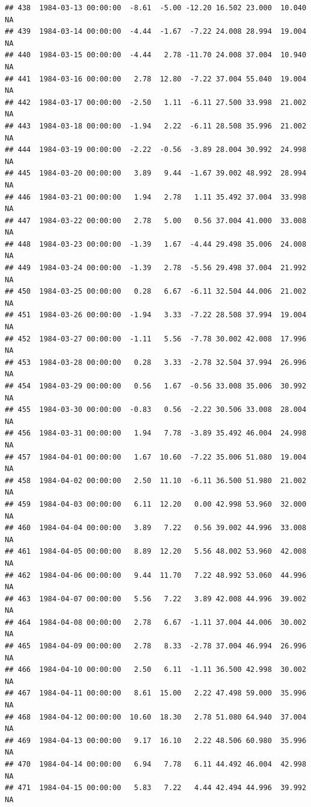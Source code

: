 \documentclass{article}\usepackage{graphicx, color}
\makeatletter
\newenvironment{kframe}{%
 \def\at@end@of@kframe{}%
 \ifinner\ifhmode%
  \def\at@end@of@kframe{\end{minipage}}%
  \begin{minipage}{\columnwidth}%
 \fi\fi%
 \def\FrameCommand##1{\hskip\@totalleftmargin \hskip-\fboxsep
 \colorbox{shadecolor}{##1}\hskip-\fboxsep
     \hskip-\linewidth \hskip-\@totalleftmargin \hskip\columnwidth}%
 \MakeFramed {\advance\hsize-\width
   \@totalleftmargin\z@ \linewidth\hsize
   \@setminipage}}%
 {\par\unskip\endMakeFramed%
 \at@end@of@kframe}
\newenvironment{knitrout}{}{} %
\makeatother
\begin{document}
\begin{knitrout}
\begin{kframe}
\begin{verbatim}
## 438  1984-03-13 00:00:00  -8.61  -5.00 -12.20 16.502 23.000  10.040     NA
## 439  1984-03-14 00:00:00  -4.44  -1.67  -7.22 24.008 28.994  19.004     NA
## 440  1984-03-15 00:00:00  -4.44   2.78 -11.70 24.008 37.004  10.940     NA
## 441  1984-03-16 00:00:00   2.78  12.80  -7.22 37.004 55.040  19.004     NA
## 442  1984-03-17 00:00:00  -2.50   1.11  -6.11 27.500 33.998  21.002     NA
## 443  1984-03-18 00:00:00  -1.94   2.22  -6.11 28.508 35.996  21.002     NA
## 444  1984-03-19 00:00:00  -2.22  -0.56  -3.89 28.004 30.992  24.998     NA
## 445  1984-03-20 00:00:00   3.89   9.44  -1.67 39.002 48.992  28.994     NA
## 446  1984-03-21 00:00:00   1.94   2.78   1.11 35.492 37.004  33.998     NA
## 447  1984-03-22 00:00:00   2.78   5.00   0.56 37.004 41.000  33.008     NA
## 448  1984-03-23 00:00:00  -1.39   1.67  -4.44 29.498 35.006  24.008     NA
## 449  1984-03-24 00:00:00  -1.39   2.78  -5.56 29.498 37.004  21.992     NA
## 450  1984-03-25 00:00:00   0.28   6.67  -6.11 32.504 44.006  21.002     NA
## 451  1984-03-26 00:00:00  -1.94   3.33  -7.22 28.508 37.994  19.004     NA
## 452  1984-03-27 00:00:00  -1.11   5.56  -7.78 30.002 42.008  17.996     NA
## 453  1984-03-28 00:00:00   0.28   3.33  -2.78 32.504 37.994  26.996     NA
## 454  1984-03-29 00:00:00   0.56   1.67  -0.56 33.008 35.006  30.992     NA
## 455  1984-03-30 00:00:00  -0.83   0.56  -2.22 30.506 33.008  28.004     NA
## 456  1984-03-31 00:00:00   1.94   7.78  -3.89 35.492 46.004  24.998     NA
## 457  1984-04-01 00:00:00   1.67  10.60  -7.22 35.006 51.080  19.004     NA
## 458  1984-04-02 00:00:00   2.50  11.10  -6.11 36.500 51.980  21.002     NA
## 459  1984-04-03 00:00:00   6.11  12.20   0.00 42.998 53.960  32.000     NA
## 460  1984-04-04 00:00:00   3.89   7.22   0.56 39.002 44.996  33.008     NA
## 461  1984-04-05 00:00:00   8.89  12.20   5.56 48.002 53.960  42.008     NA
## 462  1984-04-06 00:00:00   9.44  11.70   7.22 48.992 53.060  44.996     NA
## 463  1984-04-07 00:00:00   5.56   7.22   3.89 42.008 44.996  39.002     NA
## 464  1984-04-08 00:00:00   2.78   6.67  -1.11 37.004 44.006  30.002     NA
## 465  1984-04-09 00:00:00   2.78   8.33  -2.78 37.004 46.994  26.996     NA
## 466  1984-04-10 00:00:00   2.50   6.11  -1.11 36.500 42.998  30.002     NA
## 467  1984-04-11 00:00:00   8.61  15.00   2.22 47.498 59.000  35.996     NA
## 468  1984-04-12 00:00:00  10.60  18.30   2.78 51.080 64.940  37.004     NA
## 469  1984-04-13 00:00:00   9.17  16.10   2.22 48.506 60.980  35.996     NA
## 470  1984-04-14 00:00:00   6.94   7.78   6.11 44.492 46.004  42.998     NA
## 471  1984-04-15 00:00:00   5.83   7.22   4.44 42.494 44.996  39.992     NA

\end{verbatim}
\end{kframe}
\end{knitrout}
\end{document}
